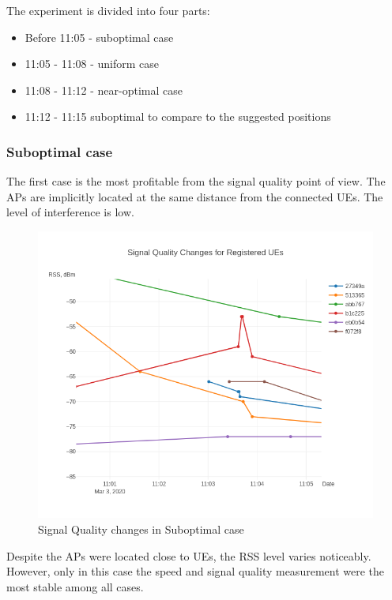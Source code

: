 The experiment is divided into four parts:

\begin{itemize}
\tightlist
\item
  Before 11:05 - suboptimal case
\item
  11:05 - 11:08 - uniform case
\item
  11:08 - 11:12 - near-optimal case
\item
  11:12 - 11:15 suboptimal to compare to the suggested positions
\end{itemize}

\subsubsection{Suboptimal case}\label{suboptimal-case}

The first case is the most profitable from the signal quality point of
view. The APs are implicitly located at the same distance from the
connected UEs. The level of interference is low.

\begin{figure}[H]
	\centering
	\includegraphics[width=\linewidth,keepaspectratio]{images/Exp4_Suboptimal.png}
\caption{Signal Quality changes in Suboptimal case}
\end{figure}

Despite the APs were located close to UEs, the RSS level varies noticeably. However, only in this case the speed and signal quality measurement were the most stable among all cases.

